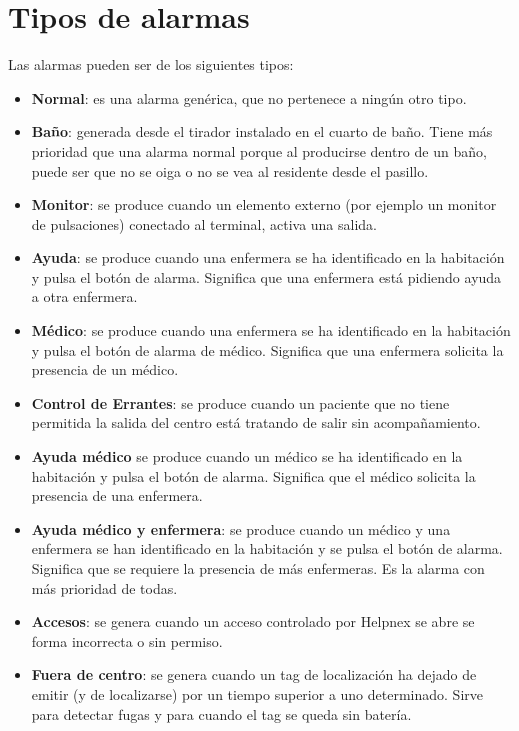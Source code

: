 \chapter{Tipos de alarmas}
\label{anexo-d}

Las alarmas pueden ser de los siguientes tipos:

\begin{itemize}
    \item \textbf{Normal}: es una alarma genérica, que no pertenece a ningún otro tipo.
    \item \textbf{Baño}: generada desde el tirador instalado en el cuarto de baño. Tiene más prioridad que una alarma normal porque al producirse dentro de un baño, puede ser que no se oiga o no se vea al residente desde el pasillo.
    \item \textbf{Monitor}: se produce cuando un elemento externo (por ejemplo un monitor de pulsaciones) conectado al terminal, activa una salida.
    \item \textbf{Ayuda}: se produce cuando una enfermera se ha identificado en la habitación y pulsa el botón de alarma. Significa que una enfermera está pidiendo ayuda a otra enfermera.
    \item \textbf{Médico}: se produce cuando una enfermera se ha identificado en la habitación y pulsa el botón de alarma de médico. Significa que una enfermera solicita la presencia de un médico.
    \item \textbf{Control de Errantes}: se produce cuando un paciente que no tiene permitida la salida del centro está tratando de salir sin acompañamiento.
    \item \textbf{Ayuda médico} se produce cuando un médico se ha identificado en la habitación y pulsa el botón de alarma. Significa que el médico solicita la presencia de una enfermera.
    \item \textbf{Ayuda médico y enfermera}: se produce cuando un médico y una enfermera se han identificado en la habitación y se pulsa el botón de alarma. Significa que se requiere la presencia de más enfermeras. Es la alarma con más prioridad de todas.
    \item \textbf{Accesos}: se genera cuando un acceso controlado por Helpnex se abre se forma incorrecta o sin permiso.
    \item \textbf{Fuera de centro}: se genera cuando un tag de localización ha dejado de emitir (y de localizarse) por un tiempo superior a uno determinado. Sirve para detectar fugas y para cuando el tag se queda sin batería.
\end{itemize}